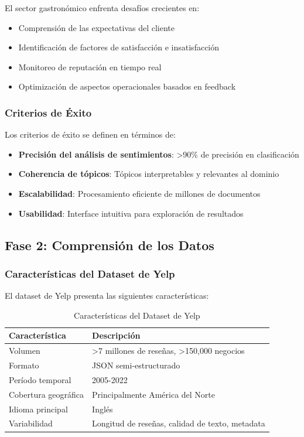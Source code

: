 \documentclass[12pt,a4paper,twoside,openany]{book}
\begin{document}
El sector gastronómico enfrenta desafíos crecientes en:
\begin{itemize}
    \item Comprensión de las expectativas del cliente
    \item Identificación de factores de satisfacción e insatisfacción
    \item Monitoreo de reputación en tiempo real
    \item Optimización de aspectos operacionales basados en feedback
\end{itemize}

\subsubsection{Criterios de Éxito}

Los criterios de éxito se definen en términos de:
\begin{itemize}
    \item \textbf{Precisión del análisis de sentimientos}: >90\% de precisión en clasificación
    \item \textbf{Coherencia de tópicos}: Tópicos interpretables y relevantes al dominio
    \item \textbf{Escalabilidad}: Procesamiento eficiente de millones de documentos
    \item \textbf{Usabilidad}: Interface intuitiva para exploración de resultados
\end{itemize}

\subsection{Fase 2: Comprensión de los Datos}

\subsubsection{Características del Dataset de Yelp}

El dataset de Yelp presenta las siguientes características:

\begin{table}[H]
\centering
\caption{Características del Dataset de Yelp}
\begin{tabular}{@{}ll@{}}
\toprule
\textbf{Característica} & \textbf{Descripción} \\
\midrule
Volumen & >7 millones de reseñas, >150,000 negocios \\
Formato & JSON semi-estructurado \\
Período temporal & 2005-2022 \\
Cobertura geográfica & Principalmente América del Norte \\
Idioma principal & Inglés \\
Variabilidad & Longitud de reseñas, calidad de texto, metadata \\
\bottomrule
\end{tabular}
\end{table}
\end{document}
